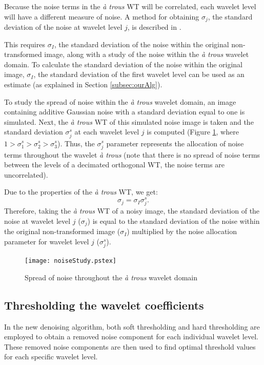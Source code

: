 \documentclass[12pt]{report}
\begin{document}
Because the noise terms in the \emph{\`a trous} WT will be correlated,
each wavelet level will have a different measure of noise.
A method for obtaining $\sigma_{j}$, the standard deviation of the noise at wavelet level $j$, is
described in \cite{stark, stark95}. 

This requires $\sigma_{I}$, the standard deviation of the noise within the
original non-transformed image, along with a study of the noise within the \emph{\`a trous} wavelet domain.
To calculate the standard deviation of the noise within the original image, $\sigma_{I}$,
the standard deviation of the first wavelet level can be used as an estimate (as explained
in Section \ref{subsec:ourAlg}).

To study the spread of noise within the \emph{\`a trous} wavelet domain, 
an image containing additive Gaussian noise with a standard deviation
equal to one is simulated. Next, the \emph{\`a trous} WT of this simulated noise
image is taken and the standard deviation $\sigma_{j}^{s}$ at each wavelet level $j$ is computed
(Figure \ref{fig:simGauss}, where $1 > \sigma_{1}^{s} > \sigma_{2}^{s} > \sigma_{3}^{s}$).
Thus, the $\sigma_{j}^{s}$ parameter represents the allocation of noise terms throughout the wavelet \emph{\`a trous} 
(note that there is no spread of noise terms between the levels of a decimated orthogonal WT, the noise terms are uncorrelated).

Due to the properties of the \emph{\` a trous} WT, we get:
\begin{equation}
        \sigma_{j}=\sigma_{I}\sigma_{j}^{s}.
        \label{eq:sigmaJ}
\end{equation}
Therefore, taking the \emph{\`a trous} WT of a noisy image,
the standard deviation of the noise at wavelet level $j$ ($\sigma_{j}$) is equal to 
the standard deviation of the noise within the original non-transformed image ($\sigma_{I}$) multiplied by
the noise allocation parameter for wavelet level $j$ ($\sigma_{j}^{s}$).

\begin{figure}[!ht]
	\begin{center}
		\texttt{[image: noiseStudy.pstex]}
		\caption{Spread of noise throughout the
		\emph{\`a trous} wavelet domain}
		\label{fig:simGauss}
	\end{center}
\end{figure}


\subsection{Thresholding the wavelet coefficients}
In the new denoising algorithm, both soft thresholding and hard thresholding are employed to obtain a removed noise component
for each individual wavelet level. These removed noise components are then used to find optimal threshold values for 
each specific wavelet level.
\end{document}
